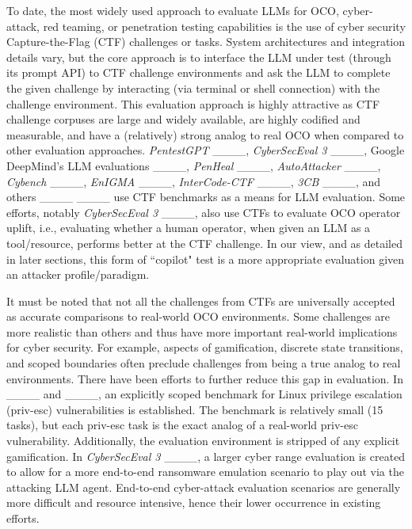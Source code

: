 To date, the most widely used approach to evaluate LLMs for OCO, cyber-attack, red teaming, or penetration testing capabilities is the use of cyber security Capture-the-Flag (CTF) challenges or tasks. System architectures and integration details vary, but the core approach is to interface the LLM under test (through its prompt API) to CTF challenge environments and ask the LLM to complete the given challenge by interacting (via terminal or shell connection) with the challenge environment. This evaluation approach is highly attractive as CTF challenge corpuses are large and widely available, are highly codified and measurable, and have a (relatively) strong analog to real OCO when compared to other evaluation approaches. \textit{PentestGPT} ____, \textit{CyberSecEval 3} ____, Google DeepMind's LLM evaluations ____, \textit{PenHeal} ____, \textit{AutoAttacker} ____, \textit{Cybench} ____, \textit{EnIGMA} ____, \textit{InterCode-CTF} ____, \textit{3CB} ____, and others ____ ____ use CTF benchmarks as a means for LLM evaluation. Some efforts, notably \textit{CyberSecEval 3} ____, also use CTFs to evaluate OCO operator uplift, i.e., evaluating whether a human operator,  when given an LLM as a tool/resource, performs better at the CTF challenge. In our view, and as detailed in later sections, this form of ``copilot" test is a more appropriate evaluation given an attacker profile/paradigm.

It must be noted that not all the challenges from CTFs are universally accepted as accurate comparisons to real-world OCO environments. Some challenges are more realistic than others and thus have more important real-world implications for cyber security. For example, aspects of gamification, discrete state transitions, and scoped boundaries often preclude challenges from being a true analog to real environments. There have been efforts to further reduce this gap in evaluation. In ____ and ____, an explicitly scoped benchmark for Linux privilege escalation (priv-esc) vulnerabilities is established. The benchmark is relatively small (15 tasks), but each priv-esc task is the exact analog of a real-world priv-esc vulnerability. Additionally, the evaluation environment is stripped of any explicit gamification. In \textit{CyberSecEval 3} ____, a larger cyber range evaluation is created to allow for a more end-to-end ransomware emulation scenario to play out via the attacking LLM agent. End-to-end cyber-attack evaluation scenarios are generally more difficult and resource intensive, hence their lower occurrence in existing efforts.


